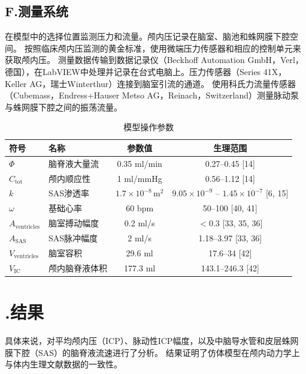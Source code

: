\documentclass[12pt]{article}
\begin{document}
\subsection*{F.测量系统}
在模型中的选择位置监测压力和流量。颅内压记录在脑室、脑池和蛛网膜下腔空间。
按照临床颅内压监测的黄金标准，使用微端压力传感器和相应的控制单元来获取颅内压。
测量数据传输到数据记录仪（Beckhoff Automation GmbH，Verl，德国），在LabVIEW中处理并记录在台式电脑上。压力传感器（Series 41X，Keller AG，瑞士Winterthur）连接到脑室引流的通道。
使用科氏力流量传感器（Cubemass，Endress+Hauser Metso AG，Reinach，Switzerland）测量脉动泵与蛛网膜下腔之间的振荡流量。
\begin{table}[h!]
    \centering
    \caption{模型操作参数}
    \renewcommand{\arraystretch}{1.5} %
    \begin{tabular}{l l c c}
    \toprule
    \textbf{符号}   &  \textbf{名称}                & \textbf{参数值} & \textbf{生理范围} \\ 
    \midrule
    $\Phi$          & 脑脊液大量流                      & 0.35 ml/min             & 0.27--0.45 [14]            \\ 
    $C_{\text{tot}}$& 颅内顺应性                   & 1 ml/mmHg               & 0.56--1.12 [14]            \\ 
    $k$             & SAS渗透率                   & $1.7 \times 10^{-8} \, \text{m}^2$ & $9.05 \times 10^{-9}$ -- $1.45 \times 10^{-7}$ [6, 15] \\ 
    $\omega$        & 基础心率                   & 60 bpm                  & 50--100 [40, 41]           \\ 
    $A_{\text{ventricles}}$ 
                    & 脑室搏动幅度     & 0.2 ml/s                & $<0.3$ [33, 35, 36]        \\ 
    $A_{\text{SAS}}$ 
                    & SAS脉冲幅度             & 2 ml/s                  & 1.18--3.97 [33, 36]        \\ 
    $V_{\text{ventricles}}$ 
                    & 脑室容积               & 29.6 ml                 & 17.6--34 [42]              \\ 
    $V_{\text{IC}}$ & 颅内脑脊液体积            & 177.3 ml                & 143.1--246.3 [42]          \\ 
    \bottomrule
    \end{tabular}
    \label{table:phantom_parameters}
\end{table}

\section*{\uppercase\expandafter{}.结果}
具体来说，对平均颅内压（ICP）、脉动性ICP幅度，以及中脑导水管和皮层蛛网膜下腔（SAS）的脑脊液流速进行了分析。
结果证明了仿体模型在颅内动力学上与体内生理文献数据的一致性。
\end{document}
